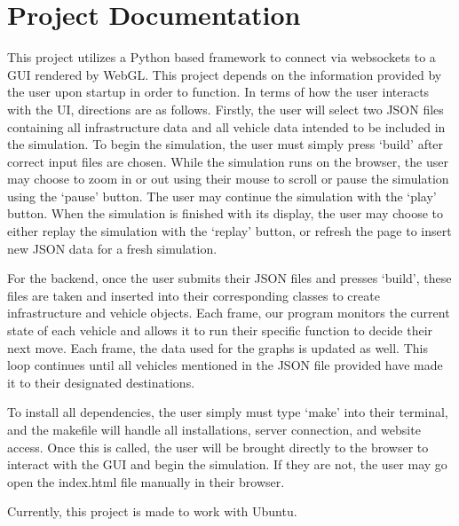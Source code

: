 \documentclass[onecolumn, draftclsnofoot,10pt, compsoc]{IEEEtran}
\begin{document}
\section{Project Documentation}
This project utilizes a Python based framework to connect via websockets to a GUI rendered by WebGL.
This project depends on the information provided by the user upon startup in order to function.
In terms of how the user interacts with the UI, directions are as follows.
Firstly, the user will select two JSON files containing all infrastructure data and all vehicle data intended to be included in the simulation.
To begin the simulation, the user must simply press ‘build’ after correct input files are chosen.
While the simulation runs on the browser, the user may choose to zoom in or out using their mouse to scroll or pause the simulation using the ‘pause’ button.
The user may continue the simulation with the ‘play’ button.
When the simulation is finished with its display, the user may choose to either replay the simulation with the ‘replay’ button, or refresh the page to insert new JSON data for a fresh simulation.

For the backend, once the user submits their JSON files and presses ‘build’, these files are taken and inserted into their corresponding classes to create infrastructure and vehicle objects.
Each frame, our program monitors the current state of each vehicle and allows it to run their specific function to decide their next move.
Each frame, the data used for the graphs is updated as well.
This loop continues until all vehicles mentioned in the JSON file provided have made it to their designated destinations.

To install all dependencies, the user simply must type ‘make’ into their terminal, and the makefile will handle all installations, server connection, and website access.
Once this is called, the user will be brought directly to the browser to interact with the GUI and begin the simulation.
If they are not, the user may go open the index.html file manually in their browser.

Currently, this project is made to work with Ubuntu.
\end{document}
